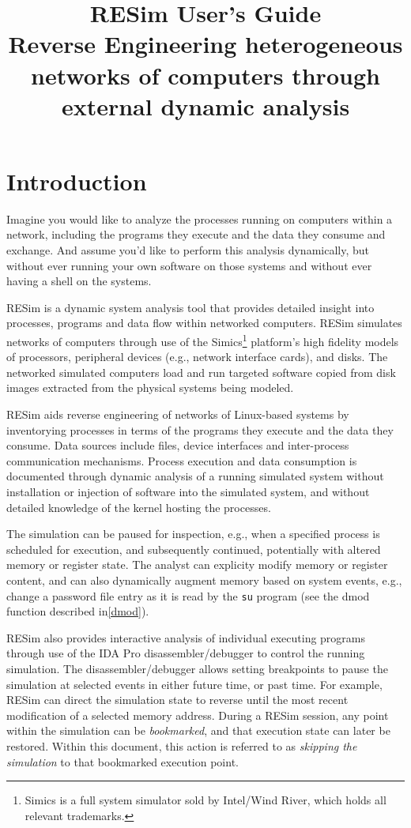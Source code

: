 \documentclass[titlepage]{article}
\begin{document}
\title {%
  RESim User's Guide \\
  \large Reverse Engineering heterogeneous networks of computers
   through external dynamic analysis}
\maketitle
\tableofcontents
\newpage

\section{Introduction}
Imagine you would like to analyze the processes running on computers within a network, including the programs they execute and the data they consume and exchange.   And assume you'd like to perform this analysis dynamically, but without ever running your own software on those systems and without ever having a shell on the systems.

RESim is a dynamic system analysis tool that provides detailed insight into processes, programs and data flow within networked computers.  RESim simulates networks of computers through use of the Simics\footnote{ Simics is a full system simulator sold by Intel/Wind River, which holds all relevant trademarks.} 
platform's high fidelity models of processors, peripheral devices (e.g., network interface cards), and disks.  The networked simulated computers load and run targeted software copied from disk images extracted from the physical systems being modeled.

RESim aids reverse engineering of networks of Linux-based systems by inventorying processes in terms of the programs they execute and the data they consume.  Data sources include files, device interfaces and inter-process communication mechanisms.   Process execution and data consumption is documented through dynamic analysis of a running simulated system without installation or injection of software into the simulated system, and without detailed knowledge of the kernel hosting the processes.

The simulation can be paused for inspection, e.g., when a specified process is scheduled for execution, and subsequently continued, potentially with altered memory or register state.  The analyst can explicity modify memory or register content, and can also dynamically augment memory 
based on system events, e.g., change a password file entry as it is read by the {\tt su} program (see the dmod function described in\ref{dmod}).

RESim also provides interactive analysis of individual executing programs through use of the IDA Pro
disassembler/debugger to control the running simulation.  The disassembler/debugger
allows setting breakpoints to pause the simulation at selected events in either future time, or past time.  For 
example, RESim can direct the simulation state to reverse until the most recent modification of a selected memory address.   During a RESim session,
any point within the simulation can be \textit{bookmarked}, and that execution state can later be restored.  Within this document, this action is referred
to as \textit{skipping the simulation} to that bookmarked execution point.
\end{document}
